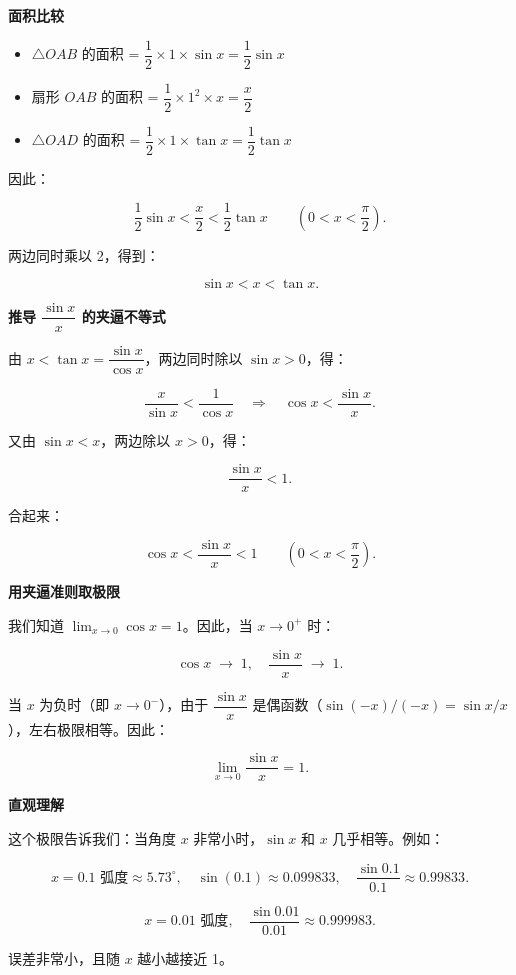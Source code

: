 \documentclass[fontset=fandol]{ctexart}
\newenvironment{custom}[1]{\par\noindent\textbf{#1}\quad}{\par\vspace{0.8em}}
\begin{document}
\begin{custom}{面积比较}

\begin{itemize}
\item \(\triangle OAB\) 的面积 = \(\dfrac{1}{2} \times 1 \times \sin x = \dfrac{1}{2} \sin x\)
\item 扇形 \(OAB\) 的面积 = \(\dfrac{1}{2} \times 1^2 \times x = \dfrac{x}{2}\)
\item \(\triangle OAD\) 的面积 = \(\dfrac{1}{2} \times 1 \times \tan x = \dfrac{1}{2} \tan x\)
\end{itemize}

因此：

\[
\dfrac{1}{2} \sin x  <  \dfrac{x}{2} < \dfrac{1}{2} \tan x \qquad (0 < x < \dfrac{\pi}{2}).
\]

两边同时乘以 2，得到：

\[
\sin x  < x < \tan x.
\]

\end{custom}

\begin{custom}{推导 \(\dfrac{\sin x}{x}\) 的夹逼不等式}

由 \(x < \tan x = \dfrac{\sin x}{\cos x}\)，两边同时除以 \(\sin x > 0\)，得：

\[
\dfrac{x}{\sin x} < \dfrac{1}{\cos x} \quad \Longrightarrow \quad \cos x < \dfrac{\sin x}{x}.
\]

又由 \(\sin x < x\)，两边除以 \(x > 0\)，得：

\[
\dfrac{\sin x}{x} < 1.
\]

合起来：

\[
\cos x < \dfrac{\sin x}{x} < 1 \qquad (0 < x < \dfrac{\pi}{2}).
\]

\end{custom}

\begin{custom}{用夹逼准则取极限}

我们知道 \(\lim_{x \to 0} \cos x = 1\)。因此，当 \(x \to 0^+\) 时：

\[
\cos x \;\longrightarrow\; 1,\quad \dfrac{\sin x}{x} \;\longrightarrow\; 1.
\]

当 \(x\) 为负时（即 \(x \to 0^-\)），由于 \(\dfrac{\sin x}{x}\) 是偶函数（\(\sin(-x)/(-x) = \sin x / x\)），左右极限相等。因此：

\[
\lim_{x \to 0} \dfrac{\sin x}{x} = 1.
\]

\end{custom}

\begin{custom}{直观理解}

这个极限告诉我们：当角度 \(x\) 非常小时，\(\sin x\) 和 \(x\) 几乎相等。例如：

\[
x = 0.1 \text{ 弧度} \approx 5.73^\circ,\quad \sin(0.1) \approx 0.099833,\quad \dfrac{\sin 0.1}{0.1} \approx 0.99833.
\]

\[
x = 0.01 \text{ 弧度},\quad \dfrac{\sin 0.01}{0.01} \approx 0.999983.
\]

误差非常小，且随 \(x\) 越小越接近 1。

\end{custom}
\end{document}
